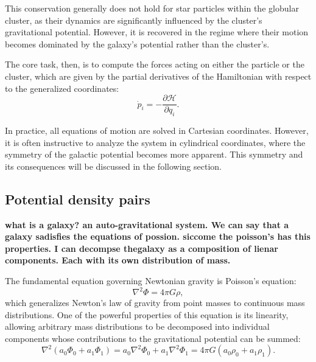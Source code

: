         This conservation generally does not hold for star particles within the globular cluster, as their dynamics are significantly influenced by the cluster's gravitational potential. However, it is recovered in the regime where their motion becomes dominated by the galaxy's potential rather than the cluster's. 

        The core task, then, is to compute the forces acting on either the particle or the cluster, which are given by the partial derivatives of the Hamiltonian with respect to the generalized coordinates:
        \begin{equation}
            \dot{p}_i = -\frac{\partial \mathcal{H}}{\partial q_i}.
        \end{equation}

        In practice, all equations of motion are solved in Cartesian coordinates. However, it is often instructive to analyze the system in cylindrical coordinates, where the symmetry of the galactic potential becomes more apparent. This symmetry and its consequences will be discussed in the following section.


        


    \subsection{Potential density pairs}

        \textbf{what is a galaxy? an auto-gravitational system. We can say that a galaxy sadisfies the equations of possion. siccome the poisson's has this properties. I can decompse thegalaxy as a composition of lienar components. Each with its own distribution of mass. }

        The fundamental equation governing Newtonian gravity is Poisson's equation:
        \begin{equation}
            \nabla^2 \Phi = 4\pi G \rho,
        \end{equation}
        which generalizes Newton's law of gravity from point masses to continuous mass distributions. One of the powerful properties of this equation is its linearity, allowing arbitrary mass distributions to be decomposed into individual components whose contributions to the gravitational potential can be summed:
        \begin{equation}
            \nabla^2 \left(a_0\Phi_0 + a_1\Phi_1 \right) = a_0 \nabla^2 \Phi_0 + a_1 \nabla^2 \Phi_1 = 4\pi G \left(a_0\rho_0 +a_1\rho_1\right).
        \end{equation}

